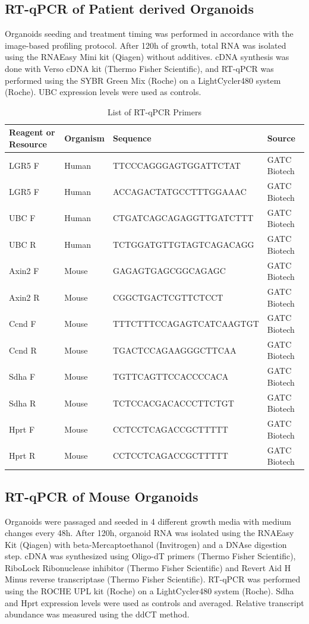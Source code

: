 \begin{flushleft}
\subsection{RT-qPCR of Patient derived Organoids}
Organoids seeding and treatment timing was performed in accordance with the image-based profiling protocol. After 120h of growth, total RNA was isolated using the RNAEasy Mini kit (Qiagen) without additives. cDNA synthesis was done with Verso cDNA kit (Thermo Fisher Scientific), and RT-qPCR was performed using the SYBR Green Mix (Roche) on a LightCycler480 system (Roche). UBC expression levels were used as controls.

\begin{table}[htb]
\caption{List of RT-qPCR Primers}
\label{tab:qpcr} %
\begin{tabularx}{\textwidth}{lXll}
\toprule
\textbf{Reagent or Resource} & \textbf{Organism} & \textbf{Sequence} & \textbf{Source} \\
\midrule
LGR5 F & Human & TTCCCAGGGAGTGGATTCTAT & GATC Biotech \\
LGR5 F & Human & ACCAGACTATGCCTTTGGAAAC & GATC Biotech \\
UBC F & Human & CTGATCAGCAGAGGTTGATCTTT & GATC Biotech \\
UBC R & Human & TCTGGATGTTGTAGTCAGACAGG & GATC Biotech \\
Axin2 F & Mouse & GAGAGTGAGCGGCAGAGC & GATC Biotech \\
Axin2 R & Mouse & CGGCTGACTCGTTCTCCT & GATC Biotech \\
Ccnd F & Mouse & TTTCTTTCCAGAGTCATCAAGTGT & GATC Biotech \\
Ccnd R & Mouse & TGACTCCAGAAGGGCTTCAA & GATC Biotech \\
Sdha F & Mouse & TGTTCAGTTCCACCCCACA & GATC Biotech \\
Sdha R & Mouse & TCTCCACGACACCCTTCTGT & GATC Biotech \\
Hprt F & Mouse & CCTCCTCAGACCGCTTTTT & GATC Biotech \\
Hprt R & Mouse & CCTCCTCAGACCGCTTTTT & GATC Biotech \\
\bottomrule
\end{tabularx}
\end{table}

\subsection{RT-qPCR of Mouse Organoids}
Organoids were passaged and seeded in 4 different growth media with medium changes every 48h. After 120h, organoid RNA was isolated using the RNAEasy Kit (Qiagen) with beta-Mercaptoethanol (Invitrogen) and a DNAse digestion step. cDNA was synthesized using Oligo-dT primers (Thermo Fisher Scientific), RiboLock Ribonuclease inhibitor (Thermo Fisher Scientific) and Revert Aid H Minus reverse transcriptase (Thermo Fisher Scientific). RT-qPCR was performed using the ROCHE UPL kit (Roche) on a LightCycler480 system (Roche). Sdha and Hprt expression levels were used as controls and averaged. Relative transcript abundance was measured using the ddCT method.
 

\end{flushleft}
